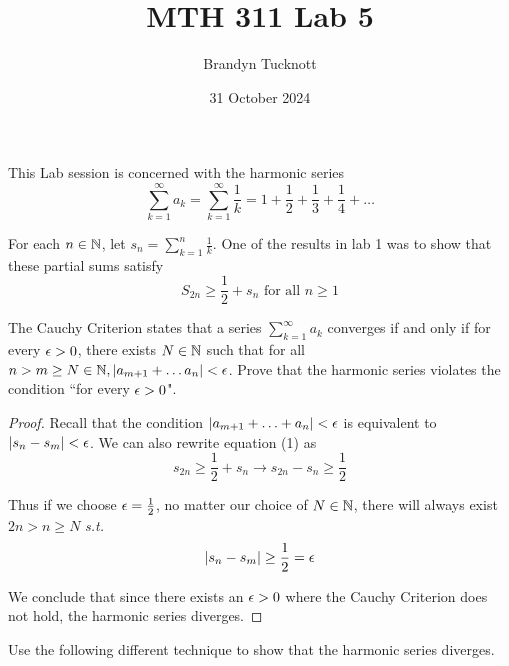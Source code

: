 \documentclass{exam}
\title{MTH 311 Lab 5}
\author{Brandyn Tucknott}
\date{31 October 2024}
\begin{document}
\maketitle
This Lab session is concerned with the harmonic series
$$\sum_{k = 1}^\infty a_k = \sum_{k = 1}^\infty \frac{1}{k} = 1 + \frac{1}{2} + \frac{1}{3} + \frac{1}{4} + \hdots$$

For each $n \in \mathbb {N}$, let $s_n = \sum_{k = 1}^n \frac{1}{k}$. One of the results in lab 1 was to show that these partial sums satisfy
\begin{equation}
    S_{2n} \geq \frac{1}{2} + s_n \text{ for all } n \geq 1
\end{equation}

\begin{questions}
    \question %
The Cauchy Criterion states that a series $\sum_{k = 1}^\infty a_k$ converges if and only if for every $\epsilon > 0$, there exists $N \in \mathbb {N}$ such that for all $n > m \geq N \in \mathbb {N}, \left| a_{m + 1} + \hdots a_n \right| < \epsilon$. Prove that the harmonic series violates the condition ``for every $\epsilon > 0$".

\begin{proof}
    Recall that the condition $\left| a_{m + 1} + \hdots + a_n \right| < \epsilon$ is equivalent to $\left| s_n - s_m \right| < \epsilon$. We can also rewrite equation (1) as
    $$s_{2n} \geq \frac{1}{2} + s_n \rightarrow
        s_{2n} - s_n \geq \frac{1}{2}$$
        
    Thus if we choose $\epsilon = \frac{1}{2}$, no matter our choice of $N \in \mathbb {N}$, there will always exist $2n > n \geq N$ \textit{ s.t. }
    $$\left| s_n - s_m \right| \geq \frac{1}{2} = \epsilon$$
    
    We conclude that since there exists an $\epsilon > 0$ where the Cauchy Criterion does not hold, the harmonic series diverges.
\end{proof}







\question %
Use the following different technique to show that the harmonic series diverges.
\end{questions}
\end{document}

